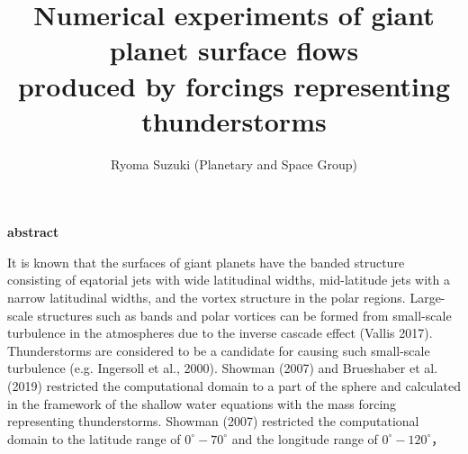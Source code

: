 \documentclass[a4j,8pt]{jarticle}
\begin{document}
\pagestyle{empty} 
\title{\Large Numerical experiments of giant planet surface flows  \\
produced by forcings representing thunderstorms
}

\author{\large Ryoma Suzuki (Planetary and Space Group)}
\date{}
\maketitle
\begin{center}
\bf \large abstract
\end{center}
%
It is known that the surfaces of giant planets have
the banded structure consisting of eqatorial jets with wide latitudinal widths,
mid-latitude jets with a narrow latitudinal widths, and
the vortex structure in the polar regions.
%
Large-scale structures such as bands and polar vortices
can be formed from small-scale turbulence in the atmospheres
due to the inverse cascade effect (Vallis 2017).
Thunderstorms are considered to be
a candidate for causing such small-scale turbulence (e.g. Ingersoll et al., 2000).
%
Showman (2007) and Brueshaber et al. (2019) restricted the
computational domain to a part of the sphere and
calculated in the framework of the shallow water equations
with the mass forcing representing thunderstorms.
%
%
Showman (2007) restricted the computational domain to the latitude range of
$0^\circ - 70^\circ$ and the longitude range of $0^\circ - 120^\circ$，
\end{document}
